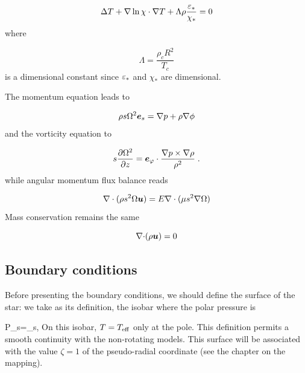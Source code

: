 \begin{equation} \Delta T + \nabla\ln\chi\cdot\nabla T +
\Lambda\rho\frac{\varepsilon_*}{\chi_*} = 0\end{equation}
where

\begin{equation} \Lambda = \frac{\rho_c R^2}{T_c}\end{equation}
is a dimensional constant since $\varepsilon_*$ and $\chi_*$ are dimensional. 

The momentum equation leads to

\begin{equation}
\rho s\Omega^2\es=\na p+\rho\na\phi
\label{baroc_nd}
\end{equation}
and the vorticity equation to

\begin{equation}
s\frac{\partial\Omega^2}{\partial z}=\ephi\cdot\frac{\na
p\times\na\rho}{\rho^2} \;.
\label{vort_nd}
\end{equation}
while angular momentum flux balance reads

\begin{equation}
\label{am_nd}
\na\cdot{(\rho s^2\Omega\vu)}=E\na\cdot (\mu s^2\na\Omega)
\end{equation}
Mass conservation remains the same

\begin{equation} \Div(\rho\vu) =0\end{equation}

\subsection{Boundary conditions}

Before presenting the boundary conditions, we should define the surface
of the star: we take as its definition, the isobar where the polar
pressure is 

\beq P_s=\tau_s,\eeq
On this isobar, $T=T_{\rm eff}$ only at the pole. This definition
permits a smooth continuity with the non-rotating models. This surface
will be associated with the value $\zeta=1$ of the pseudo-radial
coordinate (see the chapter on the mapping).

